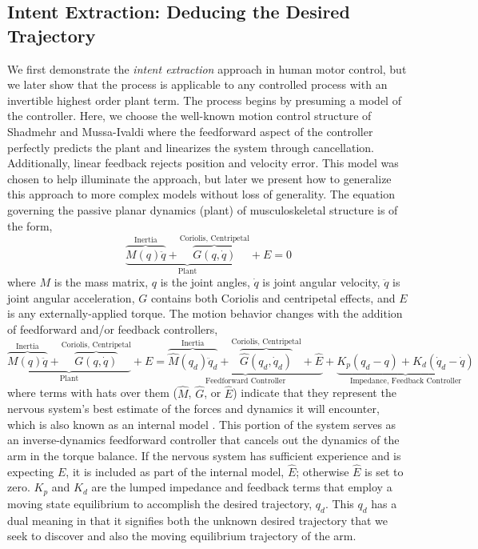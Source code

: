 \subsection*{Intent Extraction: Deducing the Desired Trajectory}
We first demonstrate the \textit{intent extraction} approach in human motor control, but we later show that the process is applicable to any controlled process with an invertible highest order plant term. The process begins by presuming a model of the controller. Here, we choose the well-known motion control structure of Shadmehr and Mussa-Ivaldi\cite{shadmehr1994adaptive} where the feedforward aspect of the controller perfectly predicts the plant and linearizes the system through cancellation. Additionally, linear feedback rejects position and velocity error. This model was chosen to help illuminate the approach, but later we present how to generalize this approach to more complex models without loss of generality. The equation governing the passive planar dynamics (plant) of musculoskeletal structure is of the form,
\begin{equation}
\underbrace{\overbrace{M(q)\ddot{q}}^{\text{Inertia}}+\overbrace{G(q,\dot{q})}^{\text{Coriolis, Centripetal}}}_{\text{Plant}}+E=0
\end{equation}
where $M$ is the mass matrix, $q$ is the joint angles, $\dot{q}$ is joint angular velocity, $\ddot{q}$ is joint angular acceleration, $G$ contains both Coriolis and centripetal effects, and $E$ is any externally-applied torque. The motion behavior changes with the addition of feedforward and/or feedback controllers,
\begin{equation} \label{eq:controlLaw}
\underbrace{\overbrace{M(q)\ddot{q}}^{\text{Inertia}}+\overbrace{G(q,\dot{q})}^{\text{Coriolis, Centripetal}}}_{\text{Plant}}+E=\underbrace{\overbrace{\hat{M}(q_d)\ddot{q}_d}^{\text{Inertia}}+\overbrace{\hat{G}(q_d,\dot{q}_d)}^{\text{Coriolis, Centripetal}}+\hat{E}}_{\text{Feedforward Controller}}+\underbrace{K_p(q_d-q)+K_d(\dot{q}_d-\dot{q})}_{\text{Impedance, Feedback Controller}}
\end{equation}
where terms with hats over them ($\hat{M}$, $\hat{G}$, or $\hat{E}$) indicate that they represent the nervous system's best estimate of the forces and dynamics it will encounter, which is also known as an internal model \cite{shadmehr1994adaptive}. This portion of the system serves as an inverse-dynamics feedforward controller that cancels out the dynamics of the arm in the torque balance. If the nervous system has sufficient experience and is expecting $E$, it is included as part of the internal model, $\hat{E}$; otherwise $\hat{E}$ is set to zero. $K_p$ and $K_d$ are the lumped impedance and feedback terms that employ a moving state equilibrium to accomplish the desired trajectory, $q_d$. This $q_d$ has a dual meaning in that it signifies both the unknown desired trajectory that we seek to discover and also the moving equilibrium trajectory of the arm.

